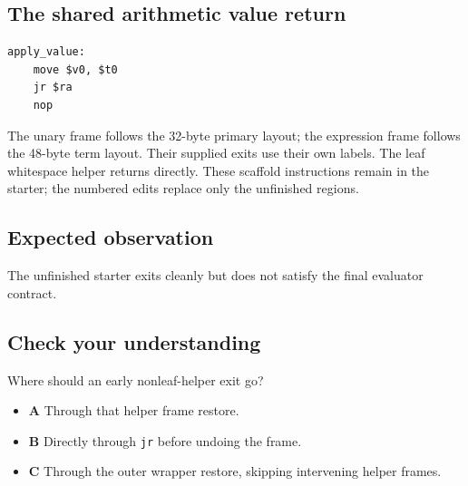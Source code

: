 \subsection{The shared arithmetic value return}
\begin{verbatim}
apply_value:
    move $v0, $t0
    jr $ra
    nop
\end{verbatim}
The unary frame follows the 32-byte primary layout; the expression frame follows the 48-byte term layout. Their supplied exits use their own labels. The leaf whitespace helper returns directly. These scaffold instructions remain in the starter; the numbered edits replace only the unfinished regions.

\subsection{Expected observation}
The unfinished starter exits cleanly but does not satisfy the final evaluator contract.

\subsection{Check your understanding}
Where should an early nonleaf-helper exit go?

\begin{itemize}
  \item \textbf{A} Through that helper frame restore.
  \item \textbf{B} Directly through \texttt{jr} before undoing the frame.
  \item \textbf{C} Through the outer wrapper restore, skipping intervening helper frames.
\end{itemize}

